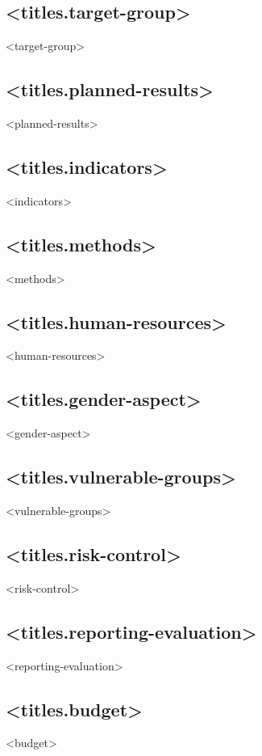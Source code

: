 \documentclass[twoside,a4paper]{article}
\begin{document}
		\subsection*{<titles.target-group>}
		    <target-group>
		
		\subsection*{<titles.planned-results>}
		    <planned-results>
		
		\subsection*{<titles.indicators>}
		    <indicators>
		
		\subsection*{<titles.methods>}
		    <methods>

		\subsection*{<titles.human-resources>}
		    <human-resources>
		
		\subsection*{<titles.gender-aspect>}
		    <gender-aspect>
		
		\subsection*{<titles.vulnerable-groups>}
		    <vulnerable-groups>
		
		\subsection*{<titles.risk-control>}
		    <risk-control>
		
		\subsection*{<titles.reporting-evaluation>}
		    <reporting-evaluation>
		
		\subsection*{<titles.budget>}
		    <budget>
		
\end{document}

